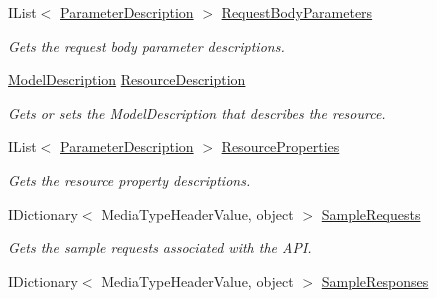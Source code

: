 \begin{DoxyCompactItemize}
I\+List$<$ \hyperlink{class_w_s1aarsproeve_1_1_areas_1_1_help_page_1_1_model_descriptions_1_1_parameter_description}{Parameter\+Description} $>$ \hyperlink{class_w_s1aarsproeve_1_1_areas_1_1_help_page_1_1_models_1_1_help_page_api_model_af72f77dc614a886b32dce0eeea00e5f7}{Request\+Body\+Parameters}
\begin{DoxyCompactList}\small\item\em Gets the request body parameter descriptions. \end{DoxyCompactList}\item 
\hyperlink{class_w_s1aarsproeve_1_1_areas_1_1_help_page_1_1_model_descriptions_1_1_model_description}{Model\+Description} \hyperlink{class_w_s1aarsproeve_1_1_areas_1_1_help_page_1_1_models_1_1_help_page_api_model_a201f882d90367109edf68d10bf0cdad0}{Resource\+Description}
\begin{DoxyCompactList}\small\item\em Gets or sets the Model\+Description that describes the resource. \end{DoxyCompactList}\item 
I\+List$<$ \hyperlink{class_w_s1aarsproeve_1_1_areas_1_1_help_page_1_1_model_descriptions_1_1_parameter_description}{Parameter\+Description} $>$ \hyperlink{class_w_s1aarsproeve_1_1_areas_1_1_help_page_1_1_models_1_1_help_page_api_model_aebe4d532bc99aca80d12ddb6923a0a49}{Resource\+Properties}
\begin{DoxyCompactList}\small\item\em Gets the resource property descriptions. \end{DoxyCompactList}\item 
I\+Dictionary$<$ Media\+Type\+Header\+Value, object $>$ \hyperlink{class_w_s1aarsproeve_1_1_areas_1_1_help_page_1_1_models_1_1_help_page_api_model_aeaaeb9dfcc5833d86d5a112d09d87ac6}{Sample\+Requests}
\begin{DoxyCompactList}\small\item\em Gets the sample requests associated with the A\+P\+I. \end{DoxyCompactList}\item 
I\+Dictionary$<$ Media\+Type\+Header\+Value, object $>$ \hyperlink{class_w_s1aarsproeve_1_1_areas_1_1_help_page_1_1_models_1_1_help_page_api_model_a00adb9ee5ab5d9a8a004fba8e6b8bf4d}{Sample\+Responses}

\end{DoxyCompactItemize}
